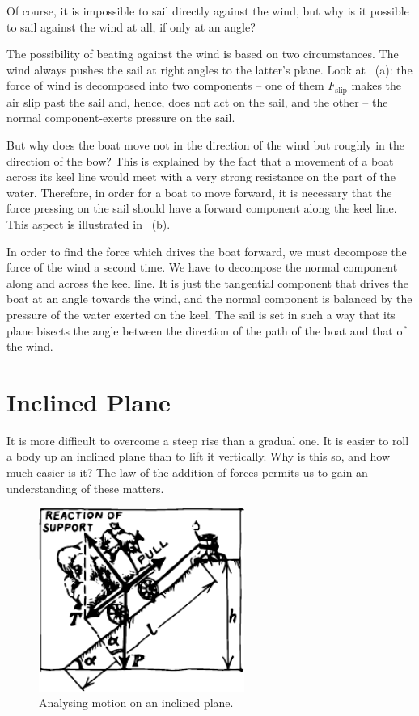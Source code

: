 Of course, it is impossible to sail directly against the wind, but why
is it possible to sail against the wind at all, if only at an angle?

The possibility of beating against the wind is based on two
circumstances. The wind always pushes the sail at right angles to the latter's plane. Look at ~{\textcolor{black!70}{(a)}}: the force of wind is decomposed into two components -- one of them $F_{\textrm{slip}}$ makes the air slip past the sail and, hence, does not act on the sail, and the other -- the normal component-exerts pressure on the sail.

But why does the boat move not in the direction of the wind but
roughly in the direction of the bow?  This is explained by the fact that a movement of a boat across its keel line would meet with a very strong resistance on the part of the water. Therefore, in order for a boat to move forward, it is necessary that the force pressing on the sail should have a forward component along the keel line. This aspect is illustrated in ~{\textcolor{black!70}{(b)}}.

In order to find the force which drives the boat forward, we
must decompose the force of the wind a second time.  We have to
decompose the normal component along and across the keel line. It is
just the tangential component that drives the boat at an angle towards
the wind, and the normal component is balanced by the pressure of the
water exerted on the keel. The sail is set in such a way that its
plane bisects the angle between the direction of the path of the boat
and that of the wind.

\section{Inclined Plane}
\label{inc-plane}
It is more difficult to overcome a steep rise than a gradual one. It
is easier to roll a body up an inclined plane than to lift it
vertically. Why is this so, and how much easier is it? The law of the
addition of forces permits us to gain an understanding of these
matters.  

\begin{figure}[!ht]
\centering
\includegraphics[width=0.6\textwidth]{figures/fig-01-11.pdf}
\caption{Analysing motion on an inclined plane.}
\label{fig-1.11}
\end{figure}

